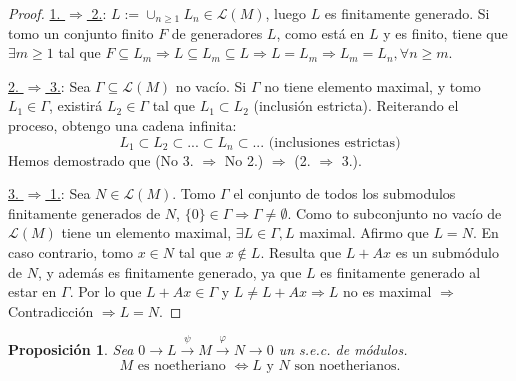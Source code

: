 \documentclass[11pt,a4paper]{article}
\theoremstyle{break}
\newtheorem{proposition}[theorem]{Proposición}
\begin{document}
\begin{proof}
\underline{1. $\Rightarrow$ 2.}: $L := \cup_{n \geq 1} L_{n} \in \mathcal{L}(M)$, luego $L$ es finitamente generado. Si tomo un conjunto finito $F$ de generadores $L$, como está en $L$ y es finito, tiene que $\exists m \geq 1$ tal que $F \subseteq L_{m} \Rightarrow L \subseteq L_{m} \subseteq L \Rightarrow L = L_{m} \Rightarrow L_{m} = L_{n}, \forall n \geq m$.

\underline{2. $\Rightarrow$ 3.}: Sea $\Gamma \subseteq \mathcal{L}(M)$ no vacío. Si $\Gamma$ no tiene elemento maximal, y tomo $L_{1} \in \Gamma$, existirá $L_{2} \in \Gamma$ tal que $L_{1} \subset L_{2}$ (inclusión estricta). Reiterando el proceso, obtengo una cadena infinita:
$$L_{1} \subset L_{2} \subset ... \subset L_{n} \subset ... \text{ (inclusiones estrictas)}$$
Hemos demostrado que (No 3. $\Rightarrow$ No 2.) $\Rightarrow$ (2. $\Rightarrow$ 3.).

\underline{3. $\Rightarrow$ 1.}: Sea $N \in \mathcal{L}(M)$. Tomo $\Gamma$ el conjunto de todos los submodulos finitamente generados de $N$, $\{0\} \in \Gamma \Rightarrow \Gamma \neq \emptyset$. Como to subconjunto no vacío de $\mathcal{L}(M)$ tiene un elemento maximal, $\exists L \in \Gamma, L$ maximal. Afirmo que $L = N$. En caso contrario, tomo $x \in N$ tal que $x \notin L$. Resulta que $L + Ax$ es un submódulo de $N$, y además es finitamente generado, ya que $L$ es finitamente generado al estar en $\Gamma$. Por lo que $L + Ax \in \Gamma$ y $L \neq L + Ax \Rightarrow L$ no es maximal $\Rightarrow$ Contradicción $\Rightarrow L = N$.
\end{proof}

\begin{proposition}
Sea $0 \to L \overset{\psi}{\to} M \overset{\varphi}{\to} N \to 0$ un s.e.c. de módulos.
$$M \text{ es noetheriano } \iff L \text{ y } N \text{ son noetherianos.}$$
\end{proposition}
\end{document}
